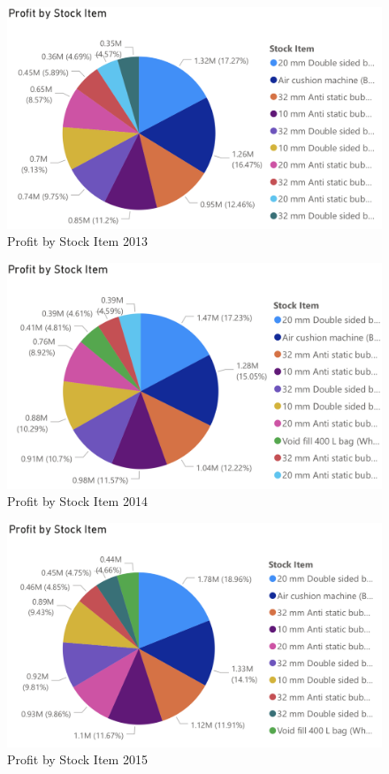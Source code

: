 \documentclass[12pt]{article}
\begin{document}
\begin{figure}[H]
    \centering
    \includegraphics [width=17.5cm]
    {images/Sales/Profit by Stock Item2013.png}
    \caption{Profit by Stock Item 2013}
    \label{Profit by Stock Item 2013}
\end{figure}

\begin{figure}[H]
    \centering
    \includegraphics [width=17.5cm]
    {images/Sales/Profit by Stock Item2014.png}
    \caption{Profit by Stock Item 2014}
    \label{Profit by Stock Item 2014}
\end{figure}

\begin{figure}[H]
    \centering
    \includegraphics [width=17.5cm]
    {images/Sales/Profit by Stock Item2015.png}
    \caption{Profit by Stock Item 2015}
    \label{Profit by Stock Item 2015}
\end{figure}
\end{document}
